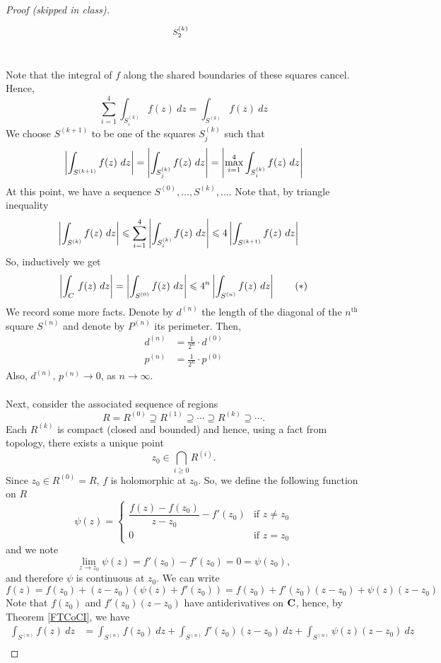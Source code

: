 \begin{proof}[Proof (skipped in class)]
\[\begin{tikzpicture}[scale=0.7]
    \node[label=above left:{\footnotesize$S_2^{(k)}$}](A) at (-1.5,1.5) {};
\end{tikzpicture}\]\\
Note that the integral of $f$ along the shared boundaries of these squares cancel. Hence, 
\[\sum_{i=1}^4\int_{S^{(k)}_i}f(z)\ dz = \int_{S^{(k)}}f(z)\ dz\]
We choose $S^{(k+1)}$ to be one of the squares $S^{(k)}_j$ such that 
\[\abs{\int_{S^{(k+1)}}f(z)\ dz} = \abs{\int_{S^{(k)}_j}f(z)\ dz} = \abs{\max_{i=1}^4\int_{S^{(k)}_i}f(z)\ dz}\]
At this point, we have a sequence $S^{(0)},\ldots,S^{(k)},\ldots$. Note that, by triangle inequality
\begin{align*}
\left\lvert\int_{S^{(k)}}f(z)\ dz\right\rvert & \leqslant \sum_{i=1}^4\left\lvert\int_{S^{(k)}_i}f(z)\ dz\right\rvert \leqslant 4\left\lvert\int_{S^{(k+1)}}f(z)\ dz\right\rvert
\end{align*}
So, inductively we get
\[\left\lvert\int_{C}\,f(z)\ dz\right\rvert = \left\lvert\int_{S^{(0)}}f(z)\ dz\right\rvert \leqslant 4^n\left\lvert\int_{S^{(n)}}f(z)\ dz\right\rvert \tag{$*$}\]
We record some more facts. Denote by $d^{(n)}$ the length of the diagonal of the $n^{\text{th}}$ square $S^{(n)}$ and denote by $P^{(n)}$ its perimeter. Then,
\begin{align*}
d^{(n)} &= \frac{1}{2^n}\cdot d^{(0)}\\[0.5em]
p^{(n)} &= \frac{1}{2^n}\cdot p^{(0)}
\end{align*}
Also, $d^{(n)},\,p^{(n)} \to 0$, as $n \to \infty$.\\
\\
Next, consider the associated sequence of regions
\[R = R^{(0)} \supseteq R^{(1)} \supseteq \cdots \supseteq R^{(k)} \supseteq \cdots.\]
Each $R^{(k)}$ is compact (closed and bounded) and hence, using a fact from topology, there exists a unique point
\[z_0 \in \bigcap_{i\geq 0}R^{(i)}.\]
Since $z_0 \in R^{(0)} = R$, $f$ is holomorphic at $z_0$. So, we define the following function on $R$
\[\psi(z) = \begin{cases} \dfrac{f(z) - f(z_0)}{z - z_0} - f'(z_0) & \text{if $z \neq z_0$}\\[1em] 0 & \text{if $z = z_0$} \end{cases}\]
and we note
\[\lim_{z \to z_0}\psi(z) = f'(z_0) - f'(z_0) = 0 = \psi(z_0),\]
and therefore $\psi$ is continuous at $z_0$. We can write
\[f(z) = f(z_0) + (z-z_0)(\psi(z) + f'(z_0)) = f(z_0) + f'(z_0)(z - z_0) + \psi(z)(z - z_0)\]
Note that $f(z_0)$ and $f'(z_0)(z - z_0)$ have antiderivatives on $\mathbf C$, hence, by Theorem \ref{FTCoCI}, we have
\begin{align*}
\int_{S^{(n)}}f(z)\ dz &= \int_{S^{(n)}}f(z_0)\ dz + \int_{S^{(n)}}f'(z_0)(z - z_0)\ dz + \int_{S^{(n)}}\psi(z)(z - z_0)\ dz\\[1em]

\end{align*}
\end{proof}

